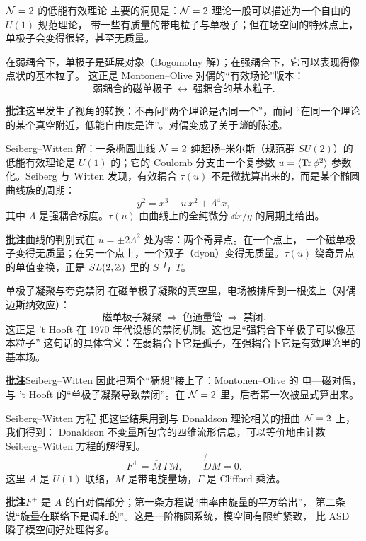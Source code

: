 \begin{frame}{$\mathcal{N}=2$ 的低能有效理论}
   主要的洞见是：$\mathcal{N}=2$ 理论一般可以描述为一个自由的 $U(1)$ 规范理论，
  带一些有质量的带电粒子与单极子；但在场空间的特殊点上，单极子会变得很轻，甚至无质量。
  \vspace{0.4em}

  在弱耦合下，单极子是延展对象（Bogomolny 解）；在强耦合下，它可以表现得像点状的基本粒子。
  这正是 Montonen--Olive 对偶的“有效场论”版本：
  \[
    \text{弱耦合的磁单极子}\;\longleftrightarrow\;\text{强耦合的基本粒子}.
  \]
  \begin{beizhu}
  \textbf{批注}\quad 这里发生了视角的转换：不再问“两个理论是否同一个”，而问
  “在同一个理论的某个真空附近，低能自由度是谁”。对偶变成了关于\emph{谱}的陈述。
  \end{beizhu}
\end{frame}

\begin{frame}{Seiberg--Witten 解：一条椭圆曲线}
  $\mathcal{N}=2$ 纯超杨--米尔斯（规范群 $SU(2)$）的低能有效理论是 $U(1)$ 的；它的 Coulomb
  分支由一个复参数 $u=\langle\operatorname{Tr}\phi^2\rangle$ 参数化。Seiberg 与 Witten 发现，有效耦合
  $\tau(u)$ 不是微扰算出来的，而是某个椭圆曲线族的周期：
  \[
    y^2=x^3-u\,x^2+\Lambda^4 x ,
  \]
  其中 $\Lambda$ 是强耦合标度。$\tau(u)$ 由曲线上的全纯微分 $\dd x/y$ 的周期比给出。
  \begin{beizhu}
  \textbf{批注}\quad 曲线的判别式在 $u=\pm2\Lambda^2$ 处为零：两个奇异点。在一个点上，
  一个磁单极子变得无质量；在另一个点上，一个双子（dyon）变得无质量。$\tau(u)$ 绕奇异点
  的单值变换，正是 $SL(2,\mathbb{Z})$ 里的 $S$ 与 $T$。
  \end{beizhu}
\end{frame}

\begin{frame}{单极子凝聚与夸克禁闭}
  在磁单极子凝聚的真空里，电场被排斥到一根弦上（对偶迈斯纳效应）：
  \[
    \text{磁单极子凝聚}\;\Longrightarrow\;\text{色通量管}\;\Longrightarrow\;
    \text{禁闭}.
  \]
  这正是 't Hooft 在 1970 年代设想的禁闭机制。这也是“强耦合下单极子可以像基本粒子”
  这句话的具体含义：在弱耦合下它是孤子，在强耦合下它是有效理论里的基本场。
  \begin{beizhu}
  \textbf{批注}\quad Seiberg--Witten 因此把两个“猜想”接上了：Montonen--Olive 的
  电—磁对偶，与 't Hooft 的“单极子凝聚导致禁闭”。在 $\mathcal{N}=2$ 里，后者第一次被显式算出来。
  \end{beizhu}
\end{frame}

\begin{frame}{Seiberg--Witten 方程}
   把这些结果用到与 Donaldson 理论相关的扭曲 $\mathcal{N}=2$ 上，我们得到：
  Donaldson 不变量所包含的四维流形信息，可以等价地由计数 Seiberg--Witten 方程的解得到。
  \[
    F^+=\overline{M}\,\Gamma M,\qquad \not{D}M=0 .
  \]
  这里 $A$ 是 $U(1)$ 联络，$M$ 是带电旋量场，$\Gamma$ 是 Clifford 乘法。
  \begin{beizhu}
  \textbf{批注}\quad $F^+$ 是 $A$ 的自对偶部分；第一条方程说“曲率由旋量的平方给出”，
  第二条说“旋量在联络下是调和的”。这是一阶椭圆系统，模空间有限维紧致，
  比 ASD 瞬子模空间好处理得多。
  \end{beizhu}
\end{frame}

